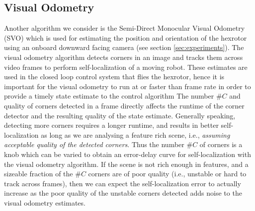 \subsection{Visual Odometry}

Another algorithm we consider is the Semi-Direct Monocular Visual Odometry (SVO)\cite{forster2014svo} which is used for estimating the position and orientation of the hexrotor using an onboard downward facing camera (see section \ref{sec:experiments}).
The visual odometry algorithm detects corners in an image and tracks them across video frames to perform self-localization of a moving robot.
These estimates are used in the closed loop control system that flies the hexrotor, hence it is important for the visual odometry to run at or faster than frame rate in order to provide a timely state estimate to the control algorithm
The number $\#C$ and quality of corners detected in a frame directly affects the runtime of the corner detector and the resulting quality of the state estimate. Generally speaking, detecting more corners requires a longer runtime, and results in better self-localization as long as we are analysing a feature rich scene, i.e., \emph{assuming acceptable quality of the detected corners}. Thus the number $\#C$ of corners is a knob which can be varied to obtain an error-delay curve for self-localization with the visual odometry algorithm.
If the scene is not rich enough in features, and a sizeable fraction of the $\#C$ corners are of poor quality (i.e., unstable or hard to track across frames), then we can expect the self-localization error to actually increase as the poor quality of the unstable corners detected adds noise to the visual odometry estimates.

